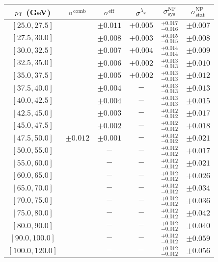 \begin{tabular}{c||c|c|c||c|c}
$p_\text{T}$ (GeV) & $\sigma^{\text{comb}}$ & $\sigma^{\text{eff}}$ & $\sigma^{\lambda_\varphi}$ & $\sigma_{\text{sys}}^{\text{NP}}$ & $\sigma_{\text{stat}}^{\text{NP}}$ \\
\hline
$[25.0, 27.5]$ & \multirow{19}{*}{$\pm0.012$} & $\pm0.011$ & $+0.005$ & $^{+0.017}_{-0.016}$ & $\pm0.007$\\
$[27.5, 30.0]$ &  & $\pm0.008$ & $+0.003$ & $^{+0.015}_{-0.015}$ & $\pm0.008$\\
$[30.0, 32.5]$ &  & $\pm0.007$ & $+0.004$ & $^{+0.014}_{-0.014}$ & $\pm0.009$\\
$[32.5, 35.0]$ &  & $\pm0.006$ & $+0.002$ & $^{+0.013}_{-0.013}$ & $\pm0.010$\\
$[35.0, 37.5]$ &  & $\pm0.005$ & $+0.002$ & $^{+0.013}_{-0.013}$ & $\pm0.012$\\
$[37.5, 40.0]$ &  & $\pm0.004$ & $-$ & $^{+0.013}_{-0.013}$ & $\pm0.013$\\
$[40.0, 42.5]$ &  & $\pm0.004$ & $-$ & $^{+0.013}_{-0.013}$ & $\pm0.015$\\
$[42.5, 45.0]$ &  & $\pm0.003$ & $-$ & $^{+0.012}_{-0.012}$ & $\pm0.017$\\
$[45.0, 47.5]$ &  & $\pm0.002$ & $-$ & $^{+0.012}_{-0.012}$ & $\pm0.018$\\
$[47.5, 50.0]$ &  & $\pm0.001$ & $-$ & $^{+0.012}_{-0.012}$ & $\pm0.021$\\
$[50.0, 55.0]$ &  & $-$ & $-$ & $^{+0.012}_{-0.012}$ & $\pm0.017$\\
$[55.0, 60.0]$ &  & $-$ & $-$ & $^{+0.012}_{-0.012}$ & $\pm0.021$\\
$[60.0, 65.0]$ &  & $-$ & $-$ & $^{+0.012}_{-0.012}$ & $\pm0.026$\\
$[65.0, 70.0]$ &  & $-$ & $-$ & $^{+0.012}_{-0.012}$ & $\pm0.034$\\
$[70.0, 75.0]$ &  & $-$ & $-$ & $^{+0.012}_{-0.012}$ & $\pm0.036$\\
$[75.0, 80.0]$ &  & $-$ & $-$ & $^{+0.012}_{-0.012}$ & $\pm0.042$\\
$[80.0, 90.0]$ &  & $-$ & $-$ & $^{+0.012}_{-0.012}$ & $\pm0.040$\\
$[90.0, 100.0]$ &  & $-$ & $-$ & $^{+0.012}_{-0.012}$ & $\pm0.059$\\
$[100.0, 120.0]$ &  & $-$ & $-$ & $^{+0.012}_{-0.012}$ & $\pm0.056$\\
\end{tabular}
